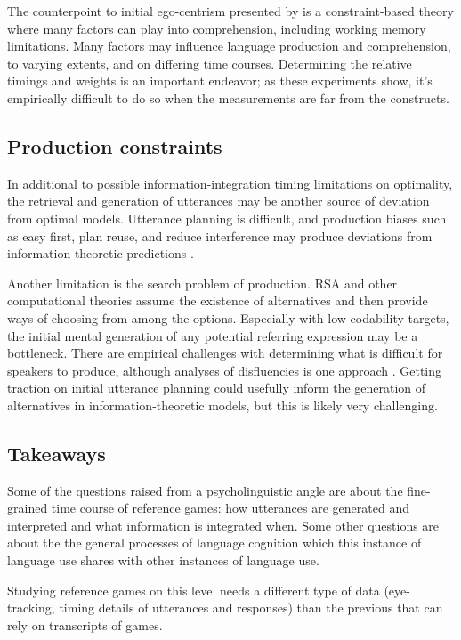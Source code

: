 \documentclass[]{article}
\begin{document}
The counterpoint to initial ego-centrism presented by \citet{hanna2003} is a constraint-based theory where many factors can play into comprehension, including working memory limitations. Many factors may influence language production and comprehension, to varying extents, and on differing time courses. Determining the relative timings and weights is an important endeavor; as these experiments show, it's empirically difficult to do so when the measurements are far from the constructs.

\subsection{Production constraints}
In additional to possible information-integration timing limitations on optimality, the retrieval and generation of utterances may be another source of deviation from optimal models. Utterance planning is difficult, and production biases such as easy first, plan reuse, and reduce interference may produce deviations from information-theoretic predictions \citep{macdonald2013}.

Another limitation is the search problem of production. RSA and other computational theories assume the existence of alternatives and then provide ways of choosing from among the options. Especially with low-codability targets, the initial mental generation of any potential referring expression may be a bottleneck. There are empirical challenges with determining what is difficult for speakers to produce, although analyses of disfluencies is one approach \citep{yoon2014}.  Getting traction on initial utterance planning could usefully inform the generation of alternatives in information-theoretic models, but this is likely very challenging. 

\subsection{Takeaways}

Some of the questions raised from a psycholinguistic angle are about the fine-grained time course of reference games: how utterances are generated and interpreted and what information is integrated when. Some other questions are about the the general processes of language cognition which this instance of language use shares with other instances of language use.

Studying reference games on this level needs a different type of data (eye-tracking, timing details of utterances and responses) than the previous that can rely on transcripts of games. 
\end{document}
